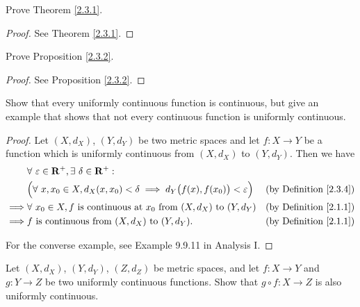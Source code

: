 \exercisesection

\begin{exercise}\label{ex 2.3.1}
    Prove Theorem \ref{2.3.1}.
\end{exercise}

\begin{proof}
    See Theorem \ref{2.3.1}.
\end{proof}

\begin{exercise}\label{ex 2.3.2}
    Prove Proposition \ref{2.3.2}.
\end{exercise}

\begin{proof}
    See Proposition \ref{2.3.2}.
\end{proof}

\begin{exercise}\label{ex 2.3.3}
    Show that every uniformly continuous function is continuous, but give an example that shows that not every continuous function is uniformly continuous.
\end{exercise}

\begin{proof}
    Let \((X, d_X)\), \((Y, d_Y)\) be two metric spaces and let \(f : X \to Y\) be a function which is uniformly continuous from \((X, d_X)\) to \((Y, d_Y)\).
    Then we have
    \begin{align*}
                 & \forall\ \varepsilon \in \mathbf{R}^+, \exists\ \delta \in \mathbf{R}^+ :                                                                   \\
                 & \Big(\forall\ x, x_0 \in X, d_X(x, x_0) < \delta \implies d_Y\big(f(x), f(x_0)\big) < \varepsilon\Big) & \text{(by Definition \ref{2.3.4})} \\
        \implies & \forall\ x_0 \in X, f \text{ is continuous at } x_0 \text{ from } (X, d_X) \text{ to } (Y, d_Y)        & \text{(by Definition \ref{2.1.1})} \\
        \implies & f \text{ is continuous from } (X, d_X) \text{ to } (Y, d_Y).                                           & \text{(by Definition \ref{2.1.1})}
    \end{align*}

    For the converse example, see Example 9.9.11 in Analysis I.
\end{proof}

\begin{exercise}\label{ex 2.3.4}
    Let \((X, d_X)\), \((Y, d_Y)\), \((Z, d_Z)\) be metric spaces, and let \(f : X \to Y\) and \(g : Y \to Z\) be two uniformly continuous functions.
    Show that \(g \circ f : X \to Z\) is also uniformly continuous.
\end{exercise}


